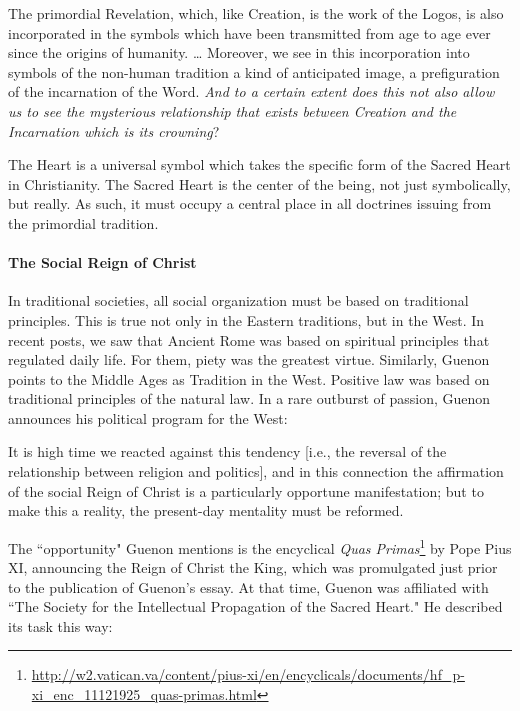 \begin{quotex}
The primordial Revelation, which, like Creation, is the work of the Logos, is also incorporated in the symbols which have been transmitted from age to age ever since the origins of humanity. … Moreover, we see in this incorporation into symbols of the non-human tradition a kind of anticipated image, a prefiguration of the incarnation of the Word. \emph{And to a certain extent does this not also allow us to see the mysterious relationship that exists between Creation and the Incarnation which is its crowning}? 

\end{quotex}
The Heart is a universal symbol which takes the specific form of the Sacred Heart in Christianity. The Sacred Heart is the center of the being, not just symbolically, but really. As such, it must occupy a central place in all doctrines issuing from the primordial tradition.

\paragraph{The Social Reign of Christ}
In traditional societies, all social organization must be based on traditional principles. This is true not only in the Eastern traditions, but in the West. In recent posts, we saw that Ancient Rome was based on spiritual principles that regulated daily life. For them, piety was the greatest virtue. Similarly, Guenon points to the Middle Ages as Tradition in the West. Positive law was based on traditional principles of the natural law. In a rare outburst of passion, Guenon announces his political program for the West:

\begin{quotex}
It is high time we reacted against this tendency [i.e., the reversal of the relationship between religion and politics], and in this connection the affirmation of the social Reign of Christ is a particularly opportune manifestation; but to make this a reality, the present-day mentality must be reformed. 

\end{quotex}
The ``opportunity" Guenon mentions is the encyclical \textit{Quas Primas}\footnote{\url{http://w2.vatican.va/content/pius-xi/en/encyclicals/documents/hf_p-xi_enc_11121925_quas-primas.html}} by Pope Pius XI, announcing the Reign of Christ the King, which was promulgated just prior to the publication of Guenon's essay. At that time, Guenon was affiliated with ``The Society for the Intellectual Propagation of the Sacred Heart." He described its task this way:

